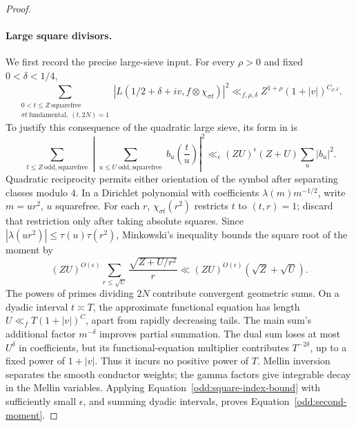 \begin{proof}
\paragraph{Large square divisors.}
We first record the precise large-sieve input.  For every $\rho>0$ and
fixed $0<\delta<1/4$,
\begin{equation}\label{odd:second-moment}
 \sum_{\substack{0<t\le Z\ \mathrm{squarefree}\\
             \sigma t\ \mathrm{fundamental},\ (t,2N)=1}}
 |L(1/2+\delta+i v,f\otimes\chi_{\sigma t})|^2
 \ll_{f,\rho,\delta} Z^{1+\rho}(1+|v|)^{C_{\rho,\delta}}.
\end{equation}
To justify this consequence of the quadratic large sieve, its form in
\citep[Theorem~1]{HeathBrown1995} is
\[
 \sum_{\substack{t\le Z\ \mathrm{odd, squarefree}}}
 \left|\sum_{\substack{u\le U\ \mathrm{odd, squarefree}}}
 b_u\left(\frac tu\right)\right|^2
 \ll_\epsilon (ZU)^\epsilon(Z+U)\sum_u|b_u|^2.
\]
Quadratic reciprocity permits either orientation of the symbol after
separating classes modulo $4$.  In a Dirichlet polynomial with coefficients
$\lambda(m)m^{-1/2}$, write $m=ur^2$, $u$ squarefree.  For each $r$,
$\chi_{\sigma t}(r^2)$ restricts $t$ to $(t,r)=1$; discard that
restriction only after taking absolute squares.  Since
$|\lambda(ur^2)|\le\tau(u)\tau(r^2)$, Minkowski's inequality bounds the
square root of the moment by
\begin{equation}\label{odd:square-index-bound}
 (ZU)^{O(\epsilon)}
 \sum_{r\le\sqrt U}\frac{\sqrt{Z+U/r^2}}r
 \ll (ZU)^{O(\epsilon)}(\sqrt Z+\sqrt U).
\end{equation}
The powers of primes dividing $2N$ contribute convergent geometric sums.
On a dyadic interval $t\asymp T$, the approximate functional equation
has length $U\ll_f T(1+|v|)^C$, apart from rapidly decreasing tails.
The main sum's additional factor $m^{-\delta}$ improves partial
summation.  The dual sum loses at most $U^\delta$ in coefficients, but
its functional-equation multiplier contributes $T^{-2\delta}$, up to
a fixed power of $1+|v|$.  Thus it incurs no positive power of $T$.
Mellin inversion separates the smooth conductor weights; the gamma
factors give integrable decay in the Mellin variables.  Applying
Equation~\eqref{odd:square-index-bound} with sufficiently small
$\epsilon$, and summing dyadic intervals, proves
Equation~\eqref{odd:second-moment}.


\end{proof}

